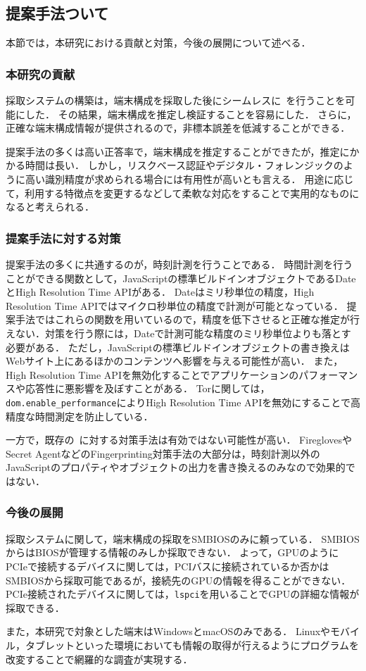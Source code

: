 \subsection{提案手法ついて}
本節では，本研究における貢献と対策，今後の展開について述べる．

\subsubsection{本研究の貢献}
採取システムの構築は，端末構成を採取した後にシームレスに\hfp~を行うことを可能にした．
その結果，端末構成を推定し検証することを容易にした．
さらに，正確な端末構成情報が提供されるので，非標本誤差を低減することができる．

提案手法の多くは高い正答率で，端末構成を推定することができたが，推定にかかる時間は長い．
しかし，リスクベース認証やデジタル・フォレンジックのように高い識別精度が求められる場合には有用性が高いとも言える．
用途に応じて，利用する特徴点を変更するなどして柔軟な対応をすることで実用的なものになると考えられる．

\subsubsection{提案手法に対する対策}
提案手法の多くに共通するのが，時刻計測を行うことである．
時間計測を行うことができる関数として，JavaScriptの標準ビルドインオブジェクトであるDateとHigh Resolution Time API\cite{high_res_time}がある．
Dateはミリ秒単位の精度，High Resolution Time APIではマイクロ秒単位の精度で計測が可能となっている．
提案手法ではこれらの関数を用いているので，精度を低下させると正確な推定が行えない．対策を行う際には，Dateで計測可能な精度のミリ秒単位よりも落とす必要がある．
ただし，JavaScriptの標準ビルドインオブジェクトの書き換えはWebサイト上にあるほかのコンテンツへ影響を与える可能性が高い．
また，High Resolution Time APIを無効化することでアプリケーションのパフォーマンスや応答性に悪影響を及ぼすことがある．
Torに関しては，\texttt{dom.enable\_performance}によりHigh Resolution Time APIを無効にすることで高精度な時間測定を防止している．

一方で，既存の\fp~に対する対策手法は有効ではない可能性が高い．
FireglovesやSecret AgentなどのFingerprinting対策手法の大部分は，時刻計測以外のJavaScriptのプロパティやオブジェクトの出力を書き換えるのみなので効果的ではない．

\subsubsection{今後の展開}
採取システムに関して，端末構成の採取をSMBIOSのみに頼っている．
SMBIOSからはBIOSが管理する情報のみしか採取できない．
よって，GPUのようにPCIeで接続するデバイスに関しては，PCIバスに接続されているか否かはSMBIOSから採取可能であるが，接続先のGPUの情報を得ることができない．
PCIe接続されたデバイスに関しては，\texttt{lspci}を用いることでGPUの詳細な情報が採取できる．

また，本研究で対象とした端末はWindowsとmacOSのみである．
Linuxやモバイル，タブレットといった環境においても情報の取得が行えるようにプログラムを改変することで網羅的な調査が実現する．
